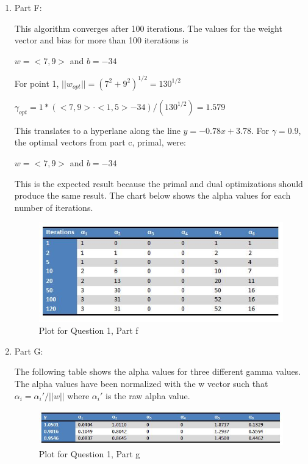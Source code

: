 \documentclass[12pt]{article}
\begin{document}
\begin{enumerate}
\item Part F:

This algorithm converges after 100 iterations. The values for the weight vector and bias for more than 100 iterations is

$w = <7,9>$ and $b = -34$

For point 1,
$||w_{opt}|| = (7^2+9^2)^{1/2} = 130^{1/2}$

$\gamma_{opt} = 1*(<7,9> \cdot <1,5> -34)/(130^{1/2}) = 1.579$

This translates to a hyperlane along the line $y = -0.78x + 3.78$. For $\gamma = 0.9$, the optimal vectors from part c, primal, were:

$w = <7,9>$ and $b = -34$

This is the expected result because the primal and dual optimizations should produce the same result. The chart below shows the alpha values for each number of iterations.

\begin{figure}[h!]
  \caption{Plot for Question 1, Part f}
  \centering
    \includegraphics[width=1\textwidth]{hw3_1f}
\end{figure}

\newpage

\item Part G:

The following table shows the alpha values for three different gamma values. The alpha values have been normalized with the w vector such that $\alpha_i = \alpha_i'/||w||$ where $\alpha_i'$ is the raw alpha value.

\begin{figure}[h!]
  \caption{Plot for Question 1, Part g}
  \centering
    \includegraphics[width=1\textwidth]{hw3_1g}
\end{figure}


\end{enumerate}
\end{document}
